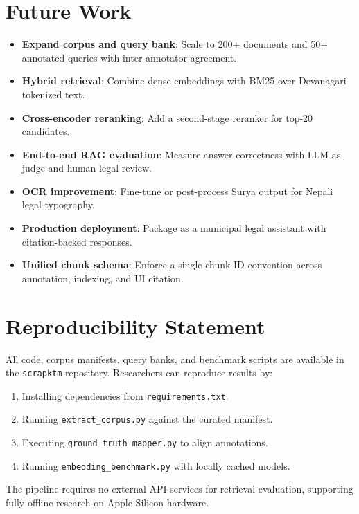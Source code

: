 \section{Future Work}
\begin{itemize}[leftmargin=*]
  \item \textbf{Expand corpus and query bank}: Scale to 200+ documents and 50+ annotated queries with inter-annotator agreement.
  \item \textbf{Hybrid retrieval}: Combine dense embeddings with BM25 over Devanagari-tokenized text.
  \item \textbf{Cross-encoder reranking}: Add a second-stage reranker for top-20 candidates.
  \item \textbf{End-to-end RAG evaluation}: Measure answer correctness with LLM-as-judge and human legal review.
  \item \textbf{OCR improvement}: Fine-tune or post-process Surya output for Nepali legal typography.
  \item \textbf{Production deployment}: Package as a municipal legal assistant with citation-backed responses.
  \item \textbf{Unified chunk schema}: Enforce a single chunk-ID convention across annotation, indexing, and UI citation.
\end{itemize}

\section{Reproducibility Statement}
All code, corpus manifests, query banks, and benchmark scripts are available in the \texttt{scrapktm} repository. Researchers can reproduce results by:
\begin{enumerate}[leftmargin=*]
  \item Installing dependencies from \texttt{requirements.txt}.
  \item Running \texttt{extract\_corpus.py} against the curated manifest.
  \item Executing \texttt{ground\_truth\_mapper.py} to align annotations.
  \item Running \texttt{embedding\_benchmark.py} with locally cached models.
\end{enumerate}

The pipeline requires no external API services for retrieval evaluation, supporting fully offline research on Apple Silicon hardware.
